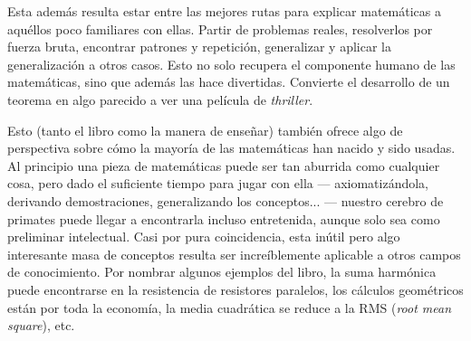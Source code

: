 Esta además resulta estar entre las mejores rutas para explicar matemáticas a aquéllos poco familiares con ellas. Partir de problemas reales, resolverlos por fuerza bruta, encontrar patrones y repetición, generalizar y aplicar la generalización a otros casos. Esto no solo recupera el componente humano de las matemáticas, sino que además las hace divertidas. Convierte el desarrollo de un teorema en algo parecido a ver una película de \textit{thriller}.

Esto (tanto el libro como la manera de enseñar) también ofrece algo de perspectiva sobre cómo la mayoría de las matemáticas han nacido y sido usadas. Al principio una pieza de matemáticas puede ser tan aburrida como cualquier cosa, pero dado el suficiente tiempo para jugar con ella --- axiomatizándola, derivando demostraciones, generalizando los conceptos... --- nuestro cerebro de primates puede llegar a encontrarla incluso entretenida, aunque solo sea como preliminar intelectual. Casi por pura coincidencia, esta inútil pero algo interesante masa de conceptos resulta ser increíblemente aplicable a otros campos de conocimiento. Por nombrar algunos ejemplos del libro, la suma harmónica puede encontrarse en la resistencia de resistores paralelos, los cálculos geométricos están por toda la economía, la media cuadrática se reduce a la RMS (\textit{root mean square}), etc.
